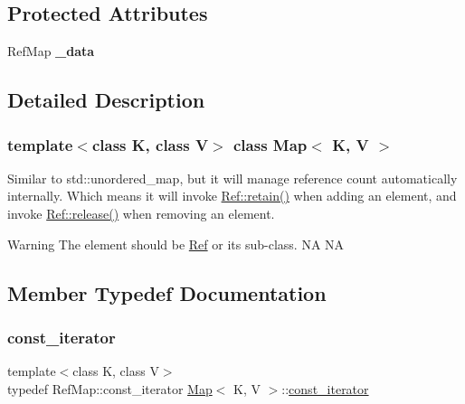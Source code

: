 \subsection*{Protected Attributes}
\begin{DoxyCompactItemize}
\item 
\mbox{\label{classMap_acf6dd17b2ef89685e4a2517cbfc7f2b0}} 
Ref\+Map {\bfseries \+\_\+data}
\end{DoxyCompactItemize}


\subsection{Detailed Description}
\subsubsection*{template$<$class K, class V$>$\newline
class Map$<$ K, V $>$}

Similar to std\+::unordered\+\_\+map, but it will manage reference count automatically internally. Which means it will invoke \hyperlink{classRef_a7d182cae1be1e80a9884cacd6ff9cb01}{Ref\+::retain()} when adding an element, and invoke \hyperlink{classRef_a6c8528cd8731765688943496c2eb3907}{Ref\+::release()} when removing an element. \begin{DoxyWarning}{Warning}
The element should be {\ttfamily \hyperlink{classRef}{Ref}} or its sub-\/class.  NA  NA 
\end{DoxyWarning}


\subsection{Member Typedef Documentation}
\mbox{\label{classMap_add90fe1e25806ba6f6278b264e78ee9a}} 
\subsubsection{\texorpdfstring{const\+\_\+iterator}{const\_iterator}\hspace{0.1cm}{\footnotesize\ttfamily [1/2]}}
{\footnotesize\ttfamily template$<$class K, class V$>$ \\
typedef Ref\+Map\+::const\+\_\+iterator \hyperlink{classMap}{Map}$<$ K, V $>$\+::\hyperlink{classMap_add90fe1e25806ba6f6278b264e78ee9a}{const\+\_\+iterator}}

